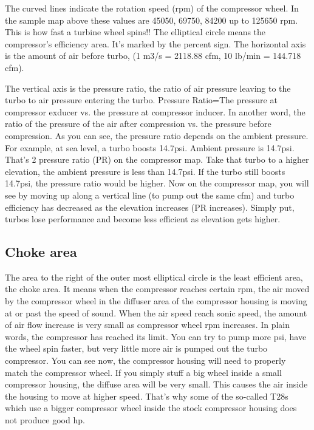 \documentclass[11pt,a4paper]{book}
\begin{document}
The curved lines indicate the rotation speed (rpm) of the compressor wheel. In the sample map
above these values are 45050, 69750, 84200 up to 125650 rpm. This is how fast a turbine wheel
spins!!
The elliptical circle means the compressor's efficiency area. It's marked by the percent sign.
The horizontal axis is the amount of air before turbo, (1 m3/s = 2118.88 cfm, 10 lb/min = 144.718
cfm).

The vertical axis is the pressure ratio, the ratio of air pressure leaving to the turbo to air pressure
entering the turbo.
Pressure Ratio=The pressure at compressor exducer vs. the pressure at compressor inducer.
In another word, the ratio of the pressure of the air after compression vs. the pressure before
compression. As you can see, the pressure ratio depends on the ambient pressure. For example, at
sea level, a turbo boosts 14.7psi. Ambient pressure is 14.7psi. That's 2 pressure ratio (PR) on the
compressor map. Take that turbo to a higher elevation, the ambient pressure is less than 14.7psi. If
the turbo still boosts 14.7psi, the pressure ratio would be higher. Now on the compressor map, you
will see by moving up along a vertical line (to pump out the same cfm) and turbo efficiency has
decreased as the elevation increases (PR increases). Simply put, turbos lose performance and become
less efficient as elevation gets higher.

\subsection{Choke area}
The area to the right of the outer most elliptical circle is the least efficient area, the choke area.
It means when the compressor reaches certain rpm, the air moved by the compressor wheel in the
diffuser area of the compressor housing is moving at or past the speed of sound. When the air speed
reach sonic speed, the amount of air flow increase is very small as compressor wheel rpm increases.
In plain words, the compressor has reached its limit. You can try to pump more psi, have the wheel
spin faster, but very little more air is pumped out the turbo compressor. You can see now, the
compressor housing will need to properly match the compressor wheel. If you simply stuff a big wheel
inside a small compressor housing, the diffuse area will be very small. This causes the air inside the
housing to move at higher speed. That's why some of the so-called T28s which use a bigger
compressor wheel inside the stock compressor housing does not produce good hp.
\end{document}
